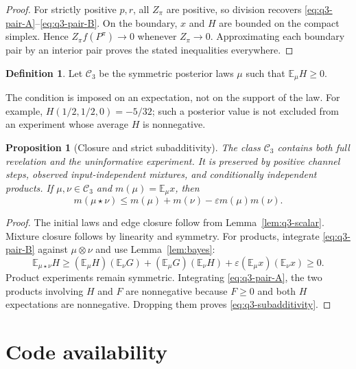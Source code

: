 \documentclass[11pt,reqno]{amsart}
\newtheorem{proposition}[theorem]{Proposition}
\theoremstyle{definition}
\newtheorem{definition}[theorem]{Definition}
\theoremstyle{remark}
\newcommand{\E}{\mathbb E}
\newcommand{\eps}{\varepsilon}
\newcommand{\cC}{\mathcal C}
\begin{document}
\begin{proof}
For strictly positive $p,r$, all $Z_\pi$ are positive, so division recovers \eqref{eq:q3-pair-A}--\eqref{eq:q3-pair-B}. On the boundary, $x$ and $H$ are bounded on the compact simplex. Hence $Z_\pi f(P^\pi)\to0$ whenever $Z_\pi\to0$. Approximating each boundary pair by an interior pair proves the stated inequalities everywhere.
\end{proof}

\begin{definition}
Let $\cC_3$ be the symmetric posterior laws $\mu$ such that $\E_\mu H\ge0$.
\end{definition}

The condition is imposed on an expectation, not on the support of the law. For example, $H(1/2,1/2,0)=-5/32$; such a posterior value is not excluded from an experiment whose average $H$ is nonnegative.

\begin{proposition}[Closure and strict subadditivity]\label{prop:q3-cone}
The class $\cC_3$ contains both full revelation and the uninformative experiment. It is preserved by positive channel steps, observed input-independent mixtures, and conditionally independent products. If $\mu,\nu\in\cC_3$ and $m(\mu)=\E_\mu x$, then
\begin{equation}\label{eq:q3-subadditivity}
 m(\mu\star\nu)\le m(\mu)+m(\nu)-\eps m(\mu)m(\nu).
\end{equation}
\end{proposition}

\begin{proof}
The initial laws and edge closure follow from Lemma~\ref{lem:q3-scalar}. Mixture closure follows by linearity and symmetry. For products, integrate \eqref{eq:q3-pair-B} against $\mu\otimes\nu$ and use Lemma~\ref{lem:bayes}:
\[
 \E_{\mu\star\nu}H\ge
 (\E_\mu H)(\E_\nu G)+(\E_\mu G)(\E_\nu H)
 +\eps (\E_\mu x)(\E_\nu x)\ge0.
\]
Product experiments remain symmetric. Integrating \eqref{eq:q3-pair-A}, the two products involving $H$ and $F$ are nonnegative because $F\ge0$ and both $H$ expectations are nonnegative. Dropping them proves \eqref{eq:q3-subadditivity}.
\end{proof}





\appendix


\section*{Code availability}
\end{document}
